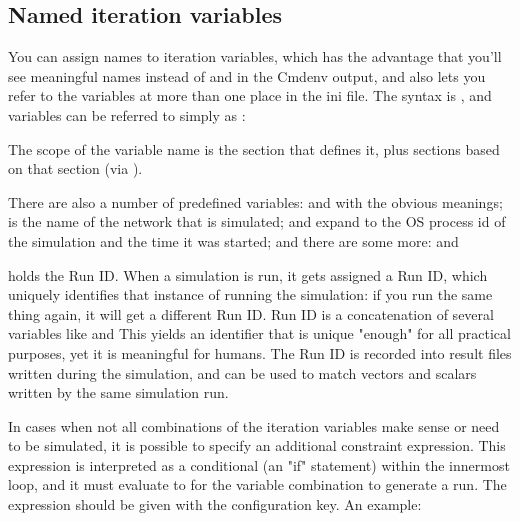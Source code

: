 \subsection{Named iteration variables}

You can assign names to iteration variables, which has the advantage
that you'll see meaningful names instead of  and
 in the Cmdenv output, and also lets you refer to the variables at
more than one place in the ini file. The syntax is
, and variables can be referred to simply as
:


The scope of the variable name is the section that defines it, plus
sections based on that section (via ).

There are also a number of predefined variables:  and
 with the obvious meanings;  is the name of
the network that is simulated;  and 
expand to the OS process id of the simulation and the time it was
started; and there are some more:   and

 holds the Run ID. When a simulation is run, it gets assigned
a Run ID, which uniquely identifies that instance of running the
simulation: if you run the same thing again, it will get a different
Run ID. Run ID is a concatenation of several variables like
   and 
This yields an identifier that is unique
"enough" for all practical purposes, yet it
is meaningful for humans. The Run ID is recorded into result files
written during the simulation, and can be used to match vectors and
scalars written by the same simulation run.

In cases when not all combinations of the iteration variables make sense
or need to be simulated, it is possible to specify an additional
constraint expression. This expression is interpreted as a conditional
(an "if" statement) within the innermost
loop, and it must evaluate to  for
the variable combination to generate a run. The expression should be
given with the  configuration key. An example:

